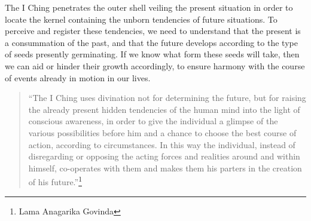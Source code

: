 \documentclass[11pt]{book}
\begin{document}
The I Ching penetrates the outer shell veiling the present situation in order to locate the kernel containing the unborn tendencies of future situations. To perceive and register these tendencies, we need to understand that the present is a consummation of the past, and that the future develops according to the type of seeds presently germinating. If we know what form these seeds will take, then we can aid or hinder their growth accordingly, to ensure harmony with the course of events already in motion in our lives.

\begin{quote}
  ``The I Ching uses divination not for determining the future, but for raising the already present hidden tendencies of the human mind into the light of conscious awareness, in order to give the individual a glimpse of the various possibilities before him and a chance to choose the best course of action, according to circumstances. In this way the individual, instead of disregarding or opposing the acting forces and realities around and within himself, co-operates with them and makes them his parters in the creation of his future.''\footnote{Lama Anagarika Govinda}
\end{quote}
\end{document}
